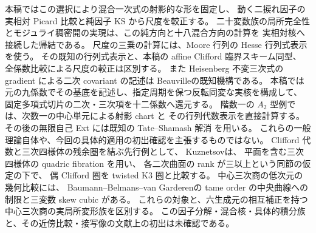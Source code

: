 本稿ではこの選択により混合一次式の射影的な形を固定し、
動く二捩れ因子の実相対 Picard 比較と純因子 KS から尺度を較正する。
二十変数族の局所完全性とモジュライ稠密開の実現は、この純方向と十八混合方向の計算を
実相対核へ接続した帰結である。
尺度の三乗の計算には、Moore 行列の Hesse 行列式表示
\cite[Sections~2.1, 2.6]{IFMBuchweitzPavlov}を使う。
その既知の行列式表示と、本稿の affine Clifford 臨界スキーム同型、
全係数比較による尺度の較正は区別する。
また Heisenberg 不変三次式の gradient による二次 covariant の記述は
Beauville\cite[Section~1, Proposition~1]{IFJBeauvilleCoble}の既知機構である。
本稿では元の九係数でその基底を記述し、指定周期を保つ反転同変な実核を構成して、
固定多項式切片の二次・三次項を十二係数へ還元する。
階数一の $A_2$ 型例では、次数一の中心単元による射影 chart と
その行列代数表示を直接計算する。
その後の無限自己 Ext には既知の Tate--Shamash 解消
\cite[Construction~4.1.3, Proposition~4.1.4, Remark~4.1.5]{CMOEisenbudPeeva}を用いる。
これらの一般理論自体や、今回の具体的適用の初出確認を主張するものではない。
Clifford 代数と三次四様体の残余圏を結ぶ先行例として、
Kuznetsov\cite[Section~4, Lemma~4.2, Theorem~4.3]{NFKuznetsovCubicFourfolds}は、
平面を含む三次四様体の quadric fibration を用い、
各二次曲面の rank が三以上という同節の仮定の下で、
偶 Clifford 圏を twisted K3 圏と比較する。
中心三次商の低次元の幾何比較には、
Baumann--Belmans--van Garderen\cite[Theorem~A, Section~6]{IFBBaumannBelmansVanGarderen}の
tame order の中央曲線への制限と三変数 skew cubic がある。
これらの対象と、六生成元の相互補正を持つ中心三次商の実局所変形族を区別する。
この因子分解・混合核・具体的積分族と、その近傍比較・接写像の文献上の初出は未確認である。

